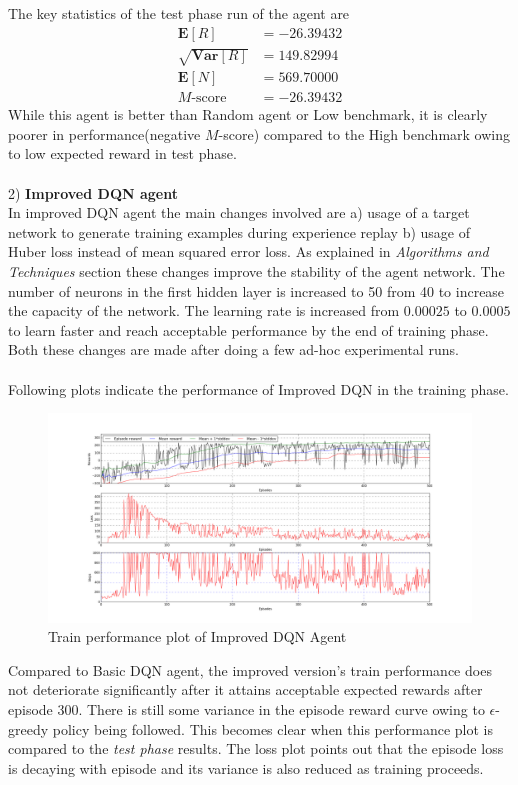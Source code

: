 \documentclass{article}
\begin{document}
The key statistics of the test phase run of the agent are
\begin{align*}
\mathbf{E}[R] &= -26.39432\\ \sqrt{\mathbf{Var}[R]} &= 149.82994\\\mathbf{E}[N] &= 569.70000\\ M\text{-score} &= -26.39432
\end{align*}
While this agent is better than Random agent or Low benchmark, it is clearly poorer in performance(negative $M$-score) compared to the High benchmark owing to low expected reward in test phase.\\\\
2) \textbf{Improved DQN agent}\\
In improved DQN agent the main changes involved are a) usage of a target network to generate training examples during experience replay b) usage of Huber loss instead of mean squared error loss. As explained in \textit{Algorithms and Techniques} section these changes improve the stability of the agent network. The number of neurons in the first hidden layer is increased to 50 from 40 to increase the capacity of the network. The learning rate is increased from $0.00025$ to $0.0005$ to learn faster and reach acceptable performance by the end of training phase. Both these changes are made after doing a few ad-hoc experimental runs.\\\\
Following plots indicate the performance of Improved DQN in the training phase.
\begin{figure}[H]
	\caption{Train performance plot of Improved DQN Agent}
	\centering
	\includegraphics[width=15cm,trim={0 0 0 0},clip]{img/fulldqn_train}
\end{figure}
Compared to Basic DQN agent, the improved version's train performance does not deteriorate significantly after it attains acceptable expected rewards after episode 300. There is still some variance in the episode reward curve owing to $\epsilon$-greedy policy being followed. This becomes clear when this performance plot is compared to the \textit{test phase} results. The loss plot points out that the episode loss is decaying with episode and its variance is also reduced as training proceeds.\\\\
\end{document}
